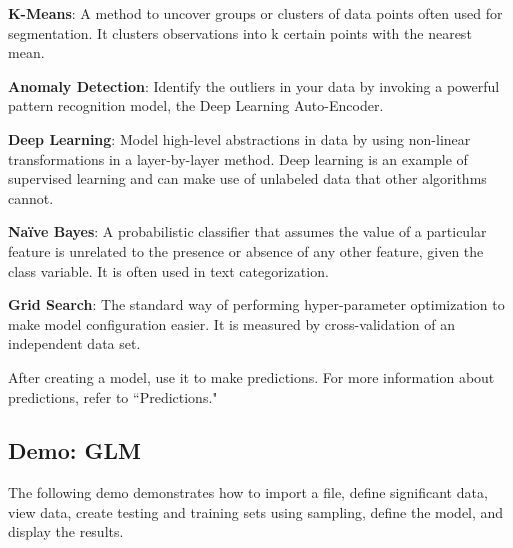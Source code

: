 {\textbf{K-Means}}: A method to uncover groups or clusters of data points often used for segmentation. It clusters observations into k certain points with the nearest mean.

{\textbf{Anomaly Detection}}: Identify the outliers in your data by invoking a powerful pattern recognition model, the Deep Learning Auto-Encoder.

{\textbf{Deep Learning}}: Model high-level abstractions in data by using non-linear transformations in a layer-by-layer method. Deep learning is an example of supervised learning and can make use of unlabeled data that other algorithms cannot.

{\textbf{Na\"{i}ve Bayes}}: A probabilistic classifier that assumes the value of a particular feature is unrelated to the presence or absence of any other feature, given the class variable. It is often used in text categorization.

{\textbf{Grid Search}}: The standard way of performing hyper-parameter optimization to make model configuration easier. It is measured by cross-validation of an independent data set. %

After creating a model, use it to make predictions. For more information about predictions, refer to ``Predictions." 

\subsection{Demo: GLM}

The following demo demonstrates how to import a file, define significant data, view data, create testing and training sets using sampling, define the model, and display the results.

